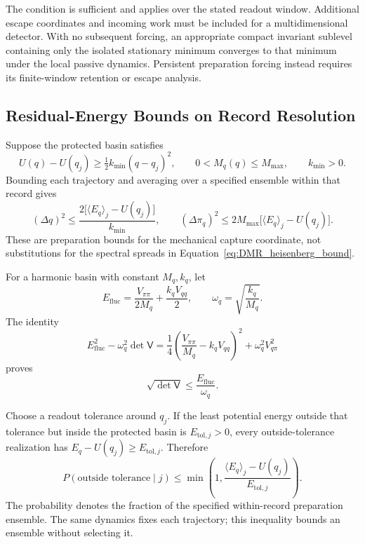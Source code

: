The condition is sufficient and applies over the stated readout window. Additional escape coordinates and incoming work must be included for a multidimensional detector. With no subsequent forcing, an appropriate compact invariant sublevel containing only the isolated stationary minimum converges to that minimum under the local passive dynamics. Persistent preparation forcing instead requires its finite-window retention or escape analysis.

\subsection{Residual-Energy Bounds on Record Resolution}

Suppose the protected basin satisfies
\begin{equation}
 U(q)-U(q_j)\geq\tfrac12k_{\min}(q-q_j)^2,
 \qquad 0<M_q(q)\leq M_{\max},
 \qquad k_{\min}>0.
\end{equation}
Bounding each trajectory and averaging over a specified ensemble within that record gives
\begin{equation}
 \boxed{
 (\Delta q)^2\leq\frac{2\bigl[\langle E_q\rangle_j-U(q_j)\bigr]}{k_{\min}},
 \qquad
 (\Delta \pi_q)^2\leq2M_{\max}\bigl[\langle E_q\rangle_j-U(q_j)\bigr]
 }.
\label{eq:DMR_resolution_energy_bounds}
\end{equation}
These are preparation bounds for the mechanical capture coordinate, not substitutions for the spectral spreads in Equation~\eqref{eq:DMR_heisenberg_bound}.

For a harmonic basin with constant $M_q,k_q$, let
\begin{equation}
 E_{\mathrm{fluc}}=\frac{V_{\pi\pi}}{2M_q}+\frac{k_qV_{qq}}2,
 \qquad \omega_q=\sqrt{\frac{k_q}{M_q}}.
\end{equation}
The identity
\begin{equation}
 E_{\mathrm{fluc}}^2-\omega_q^2\det\mathsf V
 =\frac14\left(\frac{V_{\pi\pi}}{M_q}-k_qV_{qq}\right)^2
 +\omega_q^2V_{q\pi}^2
\end{equation}
proves
\begin{equation}
 \boxed{\sqrt{\det\mathsf V}\leq\frac{E_{\mathrm{fluc}}}{\omega_q}}.
\label{eq:DMR_energy_area_bound}
\end{equation}

Choose a readout tolerance around $q_j$. If the least potential energy outside that tolerance but inside the protected basin is $E_{\mathrm{tol},j}>0$, every outside-tolerance realization has $E_q-U(q_j)\geq E_{\mathrm{tol},j}$. Therefore
\begin{equation}
 \boxed{
 P(\text{outside tolerance}\mid j)
 \leq\min\left(1,
 \frac{\langle E_q\rangle_j-U(q_j)}{E_{\mathrm{tol},j}}
 \right)
 }.
\label{eq:DMR_readout_bound}
\end{equation}
The probability denotes the fraction of the specified within-record preparation ensemble. The same dynamics fixes each trajectory; this inequality bounds an ensemble without selecting it.

